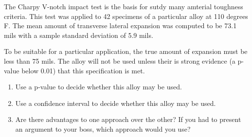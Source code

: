 \documentclass[twoside]{book}
\begin{document}
\begin{problem}
	The Charpy V-notch impact test is the basis for sutdy many amterial toughness criteria.
	This test was applied to 42 specimens of a particular alloy at 110 degrees F.
	The mean amount of transverse lateral expansion was computed to be
	73.1 mils with a sample standard deviation of 5.9 mils.

	To be suitable for a particular application, the true amount of expansion must be less than 75 mils.
	The alloy will not be used unless their is strong evidence (a p-value below 0.01) that 
	this specification is met.

	\begin{enumerate}
		\item
			Use a p-value to decide whether this alloy may be used.
		\item
			Use a confidence interval to decide whether this alloy may be used.
		\item
			Are there advantages to one approach over the other?  If you had to present
			an argument to your boss, which approach would you use?
	\end{enumerate}
\end{problem}
\end{document}
